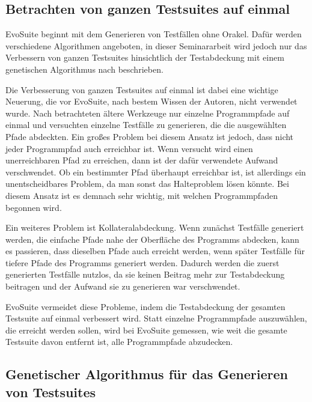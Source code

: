 \documentclass[a4paper,11pt]{article}
\begin{document}
\subsection{Betrachten von ganzen Testsuites auf einmal}

EvoSuite beginnt mit dem Generieren von Testfällen ohne Orakel.
Dafür werden verschiedene Algorithmen angeboten, in dieser Seminararbeit wird jedoch nur das Verbessern von ganzen Testsuites hinsichtlich der Testabdeckung mit einem genetischen Algorithmus nach \cite{TSE12_EvoSuite} beschrieben.

Die Verbesserung von ganzen Testsuites auf einmal ist dabei eine wichtige Neuerung, die vor EvoSuite, nach bestem Wissen der Autoren, nicht verwendet wurde.
Nach \cite{?} betrachteten ältere Werkzeuge nur einzelne Programmpfade auf einmal und versuchten einzelne Testfälle zu generieren, die die ausgewählten Pfade abdeckten.
Ein großes Problem bei diesem Ansatz ist jedoch, dass nicht jeder Programmpfad auch erreichbar ist.
Wenn versucht wird einen unerreichbaren Pfad zu erreichen, dann ist der dafür verwendete Aufwand verschwendet.
Ob ein bestimmter Pfad überhaupt erreichbar ist, ist allerdings ein unentscheidbares Problem, da man sonst das Halteproblem lösen könnte.
Bei diesem Ansatz ist es demnach sehr wichtig, mit welchen Programmpfaden begonnen wird.

Ein weiteres Problem ist Kollateralabdeckung.
Wenn zunächst Testfälle generiert werden, die einfache Pfade nahe der Oberfläche des Programms abdecken, kann es passieren, dass dieselben Pfade auch erreicht werden, wenn später Testfälle für tiefere Pfade des Programms generiert werden.
Dadurch werden die zuerst generierten Testfälle nutzlos, da sie keinen Beitrag mehr zur Testabdeckung beitragen und der Aufwand sie zu generieren war verschwendet.

EvoSuite vermeidet diese Probleme, indem die Testabdeckung der gesamten Testsuite auf einmal verbessert wird.
Statt einzelne Programmpfade auszuwählen, die erreicht werden sollen, wird bei EvoSuite gemessen, wie weit die gesamte Testsuite davon entfernt ist, alle Programmpfade abzudecken.

\subsection{Genetischer Algorithmus für das Generieren von Testsuites}
\end{document}
